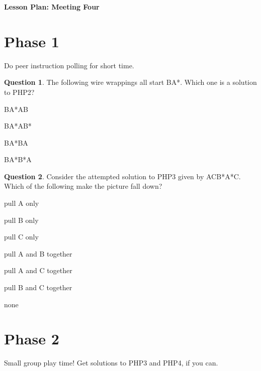 \documentclass[12pt]{amsart}
\theoremstyle{definition}
\newtheorem{question}{Question}
\begin{document}
\begin{center}
\textbf{\Huge
Lesson Plan: Meeting Four
}
\end{center}
\vspace{.5in}

\section*{Phase 1}
Do peer instruction polling for short time.

\begin{question} 
The following wire wrappings all start BA*.  
Which one is a solution to PHP2?
\begin{compactitem}
    \item BA*AB
    \item BA*AB*
    \item BA*BA
    \item BA*B*A
\end{compactitem}
\end{question}

\begin{question}
 Consider the attempted solution to PHP3 given by ACB*A*C. 
 Which of the following make the picture fall down?
\begin{compactitem}
	\item pull A only
	\item pull B only
	\item pull C only
	\item pull A and B together
	\item pull A and C together
	\item pull B and C together
	\item none
\end{compactitem}
\end{question}

\section*{Phase 2}
Small group play time! Get solutions to PHP3 and PHP4, if you can.
\end{document}
